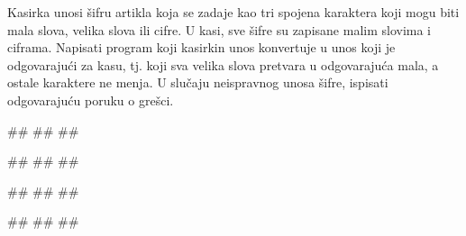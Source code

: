 \begin{Exercise}[label=KT_NG_11] 
Kasirka unosi šifru artikla koja se zadaje kao tri spojena karaktera koji mogu biti mala slova, velika slova ili cifre. 
U kasi, sve šifre su zapisane malim slovima i ciframa. Napisati program koji kasirkin unos konvertuje u unos
koji je odgovarajući za kasu, tj. koji sva velika slova pretvara u odgovarajuća mala, a ostale karaktere ne menja. 
U slučaju neispravnog unosa šifre, ispisati odgovarajuću poruku o grešci.

\begin{miditest}
\begin{upotreba}{1}
#\naslovInt#
##
##
\end{upotreba}
\end{miditest}
\begin{miditest}
\begin{upotreba}{2}
#\naslovInt#
##
##
\end{upotreba}
\end{miditest}

\begin{miditest}
\begin{upotreba}{3}
#\naslovInt#
##
##
\end{upotreba}
\end{miditest}
\begin{miditest}
\begin{upotreba}{4}
#\naslovInt#
##
##
\end{upotreba}
\end{miditest}
\end{Exercise}
\ifresenja
 \begin{Answer}[ref=KT_NG_11]
\end{Answer}
\fi 


